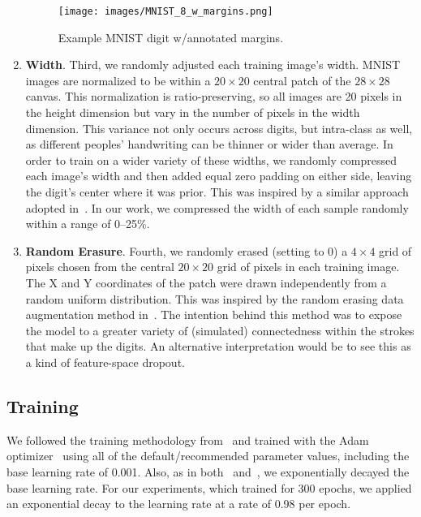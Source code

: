 \documentclass{article}
\newcommand{\rightparenthesis}{)}
\begin{document}
\begin{enumerate}[label=\arabic*\rightparenthesis]
\begin{figure}[ht]
  \centering
  \texttt{[image: images/MNIST\_8\_w\_margins.png]}
  \caption{Example MNIST digit w/annotated margins.}\label{fig:example_mnist_digit}
\end{figure}

\item \textbf{Width}.  Third, we randomly adjusted each training image's width.  MNIST images are normalized to be within a \(20\times20\) central patch of the \(28\times28\) canvas.  This normalization is ratio-preserving, so all images are 20 pixels in the height dimension but vary in the number of pixels in the width dimension.  This variance not only occurs across digits, but intra-class as well, as different peoples' handwriting can be thinner or wider than average.  In order to train on a wider variety of these widths, we randomly compressed each image's width and then added equal zero padding on either side, leaving the digit's center where it was prior.  This was inspired by a similar approach adopted in~\cite{Ciresan2012}.  In our work, we compressed the width of each sample randomly within a range of 0--25\%.
\item \textbf{Random Erasure}.  Fourth, we randomly erased (setting to 0) a \(4\times4\) grid of pixels chosen from the central \(20\times20\) grid of pixels in each training image.  The X and Y coordinates of the patch were drawn independently from a random uniform distribution.  This was inspired by the random erasing data augmentation method in~\cite{Zhong2017}.  The intention behind this method was to expose the model to a greater variety of (simulated) connectedness within the strokes that make up the digits.  An alternative interpretation would be to see this as a kind of feature-space dropout.
\end{enumerate}

\subsection{Training}

We followed the training methodology from~\cite{Byerly2019} and trained with the Adam optimizer~\cite{Kingma2014} using all of the default/recommended parameter values, including the base learning rate of 0.001.  Also, as in both~\cite{Byerly2019} and~\cite{Sabour2017}, we exponentially decayed the base learning rate.  For our experiments, which trained for 300 epochs, we applied an exponential decay to the learning rate at a rate of 0.98 per epoch.
\end{document}
